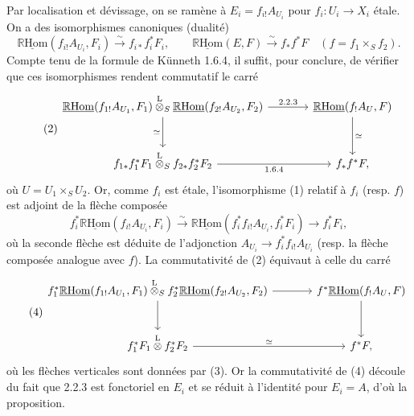 \documentclass[11pt]{article}
\newcommand{\R}{\mathbb{R}}\newcommand{\RHomCore}{\mathbb{R}\mathrm{Hom}}
\providecommand{\RHom}{\RHomCore}
\providecommand{\uRHom}{\underline{\RHom}}
\providecommand{\RHom}{\RHomCore}
\providecommand{\RHom}{\R\mathcal{H}om}
\providecommand{\R}{\mathrm R}
\providecommand{\RHom}{\RHomCore}
\begin{document}
Par localisation et dévissage, on se ramène à $E_i=f_{i!}A_{U_i}$ pour $f_i:U_i\to X_i$ étale. On a des isomorphismes canoniques (dualité)
\begin{equation}\tag{1}
\uRHom(f_{i!}A_{U_i},F_i)\xrightarrow{\sim}f_{i*}f_i^{*}F_i,
\qquad
\uRHom(E,F)\xrightarrow{\sim}f_{*}f^{*}F\quad(f=f_1\times_S f_2).
\end{equation}
Compte tenu de la formule de Künneth 1.6.4, il suffit, pour conclure, de vérifier que ces isomorphismes rendent commutatif le carré
\begin{equation}\tag{2}
\begin{tikzcd}[column sep=large,row sep=large]
\uRHom(f_{1!}A_{U_1},F_1)\overset{\mathrm{L}}{\otimes}_{S}\uRHom(f_{2!}A_{U_2},F_2) \arrow[r,"2.2.3"] \arrow[d,"\simeq"'] & \uRHom(f_{!}A_U,F) \arrow[d,"\simeq"]\\
f_{1*}f_1^{*}F_1\overset{\mathrm{L}}{\otimes}_{S}f_{2*}f_2^{*}F_2 \arrow[r,"1.6.4"'] & f_{*}f^{*}F,
\end{tikzcd}
\end{equation}
où $U=U_1\times_S U_2$. Or, comme $f_i$ est étale, l'isomorphisme (1) relatif à $f_i$ (resp. $f$) est adjoint de la flèche composée
\begin{equation}\tag{3}
f_i^{*}\uRHom(f_{i!}A_{U_i},F_i)\xrightarrow{\sim}\uRHom(f_i^{*}f_{i!}A_{U_i},f_i^{*}F_i)\longrightarrow f_i^{*}F_i,
\end{equation}
où la seconde flèche est déduite de l'adjonction $A_{U_i}\to f_i^{*}f_{i!}A_{U_i}$ (resp. la flèche composée analogue avec $f$). La commutativité de (2) équivaut à celle du carré
\begin{equation}\tag{4}
\begin{tikzcd}[column sep=large,row sep=large]
f_1^{*}\uRHom(f_{1!}A_{U_1},F_1)\overset{\mathrm{L}}{\otimes}_{S}f_2^{*}\uRHom(f_{2!}A_{U_2},F_2) \arrow[r] \arrow[d] & f^{*}\uRHom(f_{!}A_U,F) \arrow[d]\\
f_1^{*}F_1\overset{\mathrm{L}}{\otimes}f_2^{*}F_2 \arrow[r,"\simeq"] & f^{*}F,
\end{tikzcd}
\end{equation}
où les flèches verticales sont données par (3). Or la commutativité de (4) découle du fait que 2.2.3 est fonctoriel en $E_i$ et se réduit à l'identité pour $E_i=A$, d'où la proposition.
\end{document}
